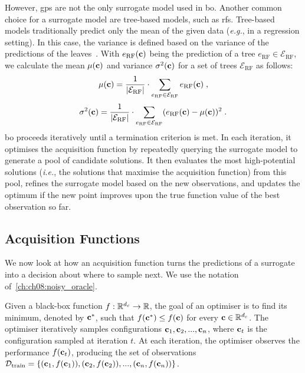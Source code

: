 However, \glspl{gp} are not the only surrogate model used in \gls{bo}. Another common choice for a surrogate model are tree-based models,
such as \glspl{rf}.
Tree-based models traditionally predict only the mean of the given data (\emph{e.g.}, in a regression setting).
In this case, the variance is defined based on the variance of the predictions of the leaves~\citep{HutEtAl11}.
With $e_{\mathrm{RF}}(\mathbf{c})$ being the prediction of a tree $e_{\mathrm{RF}} \in \mathcal E_{\mathrm{RF}}$, we calculate the mean $\mu(\mathbf{c})$ and variance $\sigma^2(\mathbf{c})$ for a set of trees $\mathcal E_{\mathrm{RF}}$ as follows:
\begin{equation}
    \mu(\mathbf{c})=\frac{1}{|\mathcal E_{\mathrm{RF}}|} \cdot \sum_{e_{\mathrm{RF}}\in \mathcal E_{\mathrm{RF}}} e_{\mathrm{RF}}(\mathbf{c}) \; ,
\end{equation}
\begin{equation}
    \sigma^2(\mathbf{c})=\frac{1}{|\mathcal E_{\mathrm{RF}}|} \cdot \sum_{e_{\mathrm{RF}}\in \mathcal E_{\mathrm{RF}}} (e_{\mathrm{RF}}(\mathbf{c}) - \mu(\mathbf{c}))^2 \; .
\end{equation}
\gls{bo} proceeds iteratively until a termination criterion is met. In each iteration, it optimises the acquisition function by repeatedly querying the surrogate model to generate a pool of candidate solutions. It then evaluates the most high-potential solutions (\emph{i.e.}, the solutions that maximise the acquisition function) from this pool,
refines the surrogate model based on the new observations, and updates the optimum if the new point improves upon the true function value of the best observation so far.

\subsection{Acquisition Functions}
\label{sec:ch02:acquisition_functions}

We now look at how an acquisition function turns the predictions of a surrogate into a decision about where to sample next. We use the notation of~\cref{ch:ch08:noisy_oracle}.

Given a black-box function $f:\mathbb{R}^{d_c}\rightarrow\mathbb{R}$, the goal of an optimiser is to find its minimum, denoted by $\mathbf{c}^*$, such that $f(\mathbf{c}^*)\leq f(\mathbf{c})$ for every $\mathbf{c}\in\mathbb{R}^{d_c}$. The optimiser iteratively samples configurations $\mathbf{c}_1, \mathbf{c}_2, ..., \mathbf{c}_n$, where $\mathbf{c}_t$ is the configuration sampled at iteration $t$.
At each iteration, the optimiser observes the performance $f(\mathbf{c}_t)$, producing the set of observations $\mathcal{D}_{\text{train}}=\{(\mathbf{c}_1, f(\mathbf{c}_1)), (\mathbf{c}_2, f(\mathbf{c}_2)),..., (\mathbf{c}_n, f(\mathbf{c}_n))\}$.


